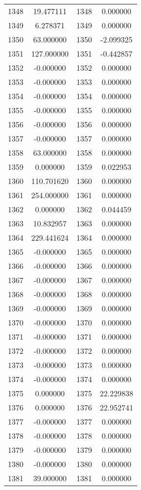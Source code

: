 \documentclass[12pt]{article}
\begin{document}
\begin{longtable}{@{}cccc@{}}
1348 & 19.477111 & 1348 & 0.000000 \\
1349 & 6.278371 & 1349 & 0.000000 \\
1350 & 63.000000 & 1350 & -2.099325 \\
1351 & 127.000000 & 1351 & -0.442857 \\
1352 & -0.000000 & 1352 & 0.000000 \\
1353 & -0.000000 & 1353 & 0.000000 \\
1354 & -0.000000 & 1354 & 0.000000 \\
1355 & -0.000000 & 1355 & 0.000000 \\
1356 & -0.000000 & 1356 & 0.000000 \\
1357 & -0.000000 & 1357 & 0.000000 \\
1358 & 63.000000 & 1358 & 0.000000 \\
1359 & 0.000000 & 1359 & 0.022953 \\
1360 & 110.701620 & 1360 & 0.000000 \\
1361 & 254.000000 & 1361 & 0.000000 \\
1362 & 0.000000 & 1362 & 0.044459 \\
1363 & 10.832957 & 1363 & 0.000000 \\
1364 & 229.441624 & 1364 & 0.000000 \\
1365 & -0.000000 & 1365 & 0.000000 \\
1366 & -0.000000 & 1366 & 0.000000 \\
1367 & -0.000000 & 1367 & 0.000000 \\
1368 & -0.000000 & 1368 & 0.000000 \\
1369 & -0.000000 & 1369 & 0.000000 \\
1370 & -0.000000 & 1370 & 0.000000 \\
1371 & -0.000000 & 1371 & 0.000000 \\
1372 & -0.000000 & 1372 & 0.000000 \\
1373 & -0.000000 & 1373 & 0.000000 \\
1374 & -0.000000 & 1374 & 0.000000 \\
1375 & 0.000000 & 1375 & 22.229838 \\
1376 & 0.000000 & 1376 & 22.952741 \\
1377 & -0.000000 & 1377 & 0.000000 \\
1378 & -0.000000 & 1378 & 0.000000 \\
1379 & -0.000000 & 1379 & 0.000000 \\
1380 & -0.000000 & 1380 & 0.000000 \\
1381 & 39.000000 & 1381 & 0.000000 \\

\end{longtable}
\end{document}
